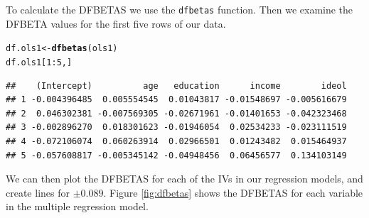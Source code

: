 \documentclass[11pt,openany]{book}\usepackage[]{graphicx}\usepackage[]{color}
\makeatletter
\newcommand{\hlnum}[1]{\textcolor[rgb]{0.686,0.059,0.569}{#1}}%
\newcommand{\hlopt}[1]{\textcolor[rgb]{0,0,0}{#1}}%
\newcommand{\hlstd}[1]{\textcolor[rgb]{0.345,0.345,0.345}{#1}}%
\newcommand{\hlkwb}[1]{\textcolor[rgb]{0.69,0.353,0.396}{#1}}%
\newcommand{\hlkwd}[1]{\textcolor[rgb]{0.737,0.353,0.396}{\textbf{#1}}}%
\newenvironment{kframe}{%
 \def\at@end@of@kframe{}%
 \ifinner\ifhmode%
  \def\at@end@of@kframe{\end{minipage}}%
  \begin{minipage}{\columnwidth}%
 \fi\fi%
 \def\FrameCommand##1{\hskip\@totalleftmargin \hskip-\fboxsep
 \colorbox{shadecolor}{##1}\hskip-\fboxsep
     \hskip-\linewidth \hskip-\@totalleftmargin \hskip\columnwidth}%
 \MakeFramed {\advance\hsize-\width
   \@totalleftmargin\z@ \linewidth\hsize
   \@setminipage}}%
 {\par\unskip\endMakeFramed%
 \at@end@of@kframe}
\newenvironment{knitrout}{}{} %
\renewenvironment{knitrout}{\begin{singlespace}}{\end{singlespace}}
\makeatother
\begin{document}
To calculate the DFBETAS we use the \texttt{dfbetas} function. Then we examine the DFBETA values for the first five rows of our data. 
\begin{knitrout}
\color{fgcolor}\begin{kframe}
\begin{alltt}
\hlstd{df.ols1} \hlkwb{<-} \hlkwd{dfbetas}\hlstd{(ols1)}
\hlstd{df.ols1[}\hlnum{1}\hlopt{:}\hlnum{5}\hlstd{, ]}
\end{alltt}
\begin{verbatim}
##    (Intercept)          age   education      income        ideol
## 1 -0.004396485  0.005554545  0.01043817 -0.01548697 -0.005616679
## 2  0.046302381 -0.007569305 -0.02671961 -0.01401653 -0.042323468
## 3 -0.002896270  0.018301623 -0.01946054  0.02534233 -0.023111519
## 4 -0.072106074  0.060263914  0.02966501  0.01243482  0.015464937
## 5 -0.057608817 -0.005345142 -0.04948456  0.06456577  0.134103149
\end{verbatim}
\end{kframe}
\end{knitrout}
We can then plot the DFBETAS for each of the IVs in our  regression models, and create lines for $\pm 0.089$.  Figure \ref{fig:dfbetas} shows the DFBETAS for each variable in the multiple regression model.   
\end{document}
